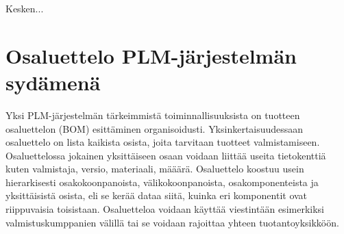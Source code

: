 Kesken... 

\section{Osaluettelo PLM-järjestelmän sydämenä} \label{Raportointi}

Yksi PLM-järjestelmän tärkeimmistä toiminnallisuuksista on tuotteen osaluettelon (BOM) esittäminen organisoidusti. \cite{david_what_2016} Yksinkertaisuudessaan osaluettelo on lista kaikista osista, joita tarvitaan tuotteet valmistamiseen. Osaluettelossa jokainen yksittäiseen osaan voidaan liittää useita tietokenttiä kuten valmistaja, versio, materiaali, määärä. Osaluettelo koostuu usein hierarkisesti osakokoonpanoista, välikokoonpanoista, osakomponenteista ja yksittäisistä osista, eli se kerää dataa siitä, kuinka eri komponentit ovat riippuvaisia toisistaan. Osaluetteloa voidaan käyttää viestintään esimerkiksi valmistuskumppanien välillä tai se voidaan rajoittaa yhteen tuotantoyksikköön.  \cite{jones_visualizing_2023}


